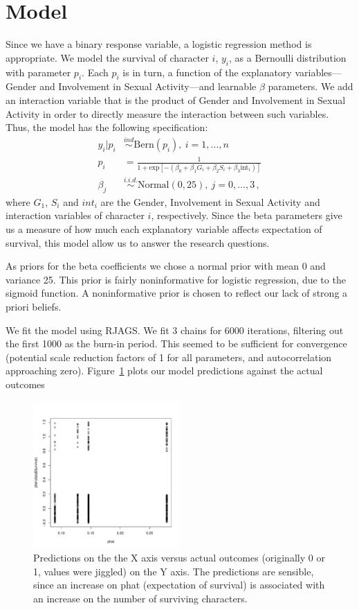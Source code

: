 \documentclass[10pt]{article}
\begin{document}
\section{Model}
Since we have a binary response variable, a logistic regression method is appropriate. We model the survival of character $i$, $y_i$, as a Bernoulli distribution with parameter $p_i$. Each $p_i$ is in turn, a function of the explanatory variables---Gender and Involvement in Sexual Activity---and learnable $\beta$ parameters. We add an interaction variable that is the product of Gender and Involvement in Sexual Activity in order to directly measure the interaction between such variables. Thus, the model has the following specification:
\begin{align}
    y_i | p_i &\stackrel{ind}{\sim} \text{Bern}(p_i),~i=1,\dots,n\\
    p_i &= \frac{1}{1+\text{exp}\left[-\left(\beta_0 + \beta_1G_i + \beta_2S_i + \beta_3\text{int}_i\right)\right]}\\
    \beta_j &\stackrel{i.i.d.}{\sim} \text{Normal}(0, 25),~j=0,\dots,3 \,,
\end{align}
where $G_1$, $S_i$ and $int_i$ are the Gender, Involvement in Sexual Activity and interaction variables of character $i$, respectively. Since the beta parameters give us a measure of how much each explanatory variable affects expectation of survival, this model allow us to answer the research questions.

As priors for the beta coefficients we chose a normal prior with mean 0 and variance 25. This prior is fairly noninformative for logistic regression, due to the sigmoid function. A noninformative prior is chosen to reflect our lack of strong a priori beliefs.

We fit the model using RJAGS. We fit 3 chains for 6000 iterations, filtering out the first 1000 as the burn-in period. This seemed to be sufficient for convergence (potential scale reduction factors of 1 for all parameters, and autocorrelation approaching zero). Figure~\ref{fig:predictions} plots our model predictions against the actual outcomes

\begin{figure}[hbtp]  
    \centering
    \includegraphics[width=0.5\textwidth]{media/predXlab.pdf}
    \caption{Predictions on the the X axis versus actual outcomes (originally 0 or 1, values were jiggled) on the Y axis. The predictions are sensible, since an increase on phat (expectation of survival) is associated with an increase on the number of surviving characters.}
    \label{fig:predictions}
    \end{figure}
\end{document}
